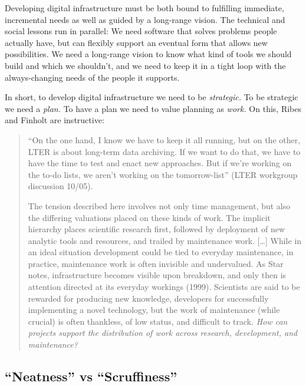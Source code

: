 \documentclass[10pt]{tufte-book}
\begin{document}
Developing digital infrastructure must be both bound to fulfilling
immediate, incremental needs as well as guided by a long-range vision.
The technical and social lessons run in parallel: We need software that
solves problems people actually have, but can flexibly support an
eventual form that allows new possibilities. We need a long-range vision
to know what kind of tools we should build and which we shouldn't, and
we need to keep it in a tight loop with the always-changing needs of the
people it supports.

In short, to develop digital infrastructure we need to be
\emph{strategic.} To be strategic we need a \emph{plan.} To have a plan
we need to value planning as \emph{work.} On this, Ribes and Finholt are
instructive:

\begin{quote}
``On the one hand, I know we have to keep it all running, but on the
other, LTER is about long-term data archiving. If we want to do that, we
have to have the time to test and enact new approaches. But if we're
working on the to-do lists, we aren't working on the tomorrow-list''
(LTER workgroup discussion 10/05).

The tension described here involves not only time management, but also
the differing valuations placed on these kinds of work. The implicit
hierarchy places scientific research first, followed by deployment of
new analytic tools and resources, and trailed by maintenance work.
{[}\ldots{]} While in an ideal situation development could be tied to
everyday maintenance, in practice, maintenance work is often invisible
and undervalued. As Star notes, infrastructure becomes visible upon
breakdown, and only then is attention directed at its everyday workings
(1999). Scientists are said to be rewarded for producing new knowledge,
developers for successfully implementing a novel technology, but the
work of maintenance (while crucial) is often thankless, of low status,
and difficult to track. \emph{How can projects support the distribution
of work across research, development, and maintenance?} \citep{ribesLongNowTechnology2009} 
\end{quote}


\subsection{``Neatness'' vs
``Scruffiness''}
\end{document}
